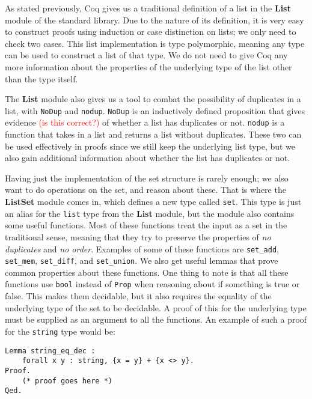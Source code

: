As stated previously, Coq gives us a traditional definition of a list in the \textbf{List} module of the standard library.
Due to the nature of its definition, it is very easy to construct proofs using induction or case distinction on lists;
we only need to check two cases.
This list implementation is type polymorphic, meaning any type can be used to construct a list of that type.
We do not need to give Coq any more information about the properties of the underlying type of the list other than the type itself.

The \textbf{List} module also gives us a tool to combat the possibility of duplicates in a list,
with \lstinline{NoDup} and \lstinline{nodup}.
\lstinline{NoDup} is an inductively defined proposition that gives evidence \textcolor{red}{(is this correct?)}
of whether a list has duplicates or not.
\lstinline{nodup} is a function that takes in a list and returns a list without duplicates.
These two can be used effectively in proofs since we still keep the underlying list type,
but we also gain additional information about whether the list has duplicates or not.

Having just the implementation of the set structure is rarely enough; we also want to do operations on the set, and reason about these.
That is where the \textbf{ListSet} module comes in, which defines a new type called \lstinline{set}.
This type is just an alias for the \lstinline{list} type from the \textbf{List} module,
but the module also contains some useful functions.
Most of these functions treat the input as a set in the traditional sense,
meaning that they try to preserve the properties of \textit{no duplicates} and \textit{no order}.
Examples of some of these functions are \lstinline{set_add}, \lstinline{set_mem},
\lstinline{set_diff}, and \lstinline{set_union}.
We also get useful lemmas that prove common properties about these functions.
One thing to note is that all these functions use \lstinline{bool} instead of
\lstinline{Prop} when reasoning about if something is true or false.
This makes them decidable, but it also requires the equality of the underlying type of the set to be decidable.
A proof of this for the underlying type must be supplied as an argument to all the functions.
An example of such a proof for the \lstinline{string} type would be:

\begin{minipage}{\linewidth}
\begin{lstlisting}[language=Coq, label={lst:string_eq_dec}, caption={Decidability proof for string equality in Coq}]
Lemma string_eq_dec :
    forall x y : string, {x = y} + {x <> y}.
Proof.
    (* proof goes here *)
Qed.
\end{lstlisting}
\end{minipage}

